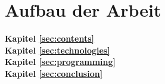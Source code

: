 \section{Aufbau der Arbeit}
\label{sec:intro:structure}

\textbf{Kapitel \ref{sec:contents}} \\[0.2em]

\textbf{Kapitel \ref{sec:technologies}} \\[0.2em]

\textbf{Kapitel \ref{sec:programming}} \\[0.2em]

\textbf{Kapitel \ref{sec:conclusion}} \\[0.2em]

